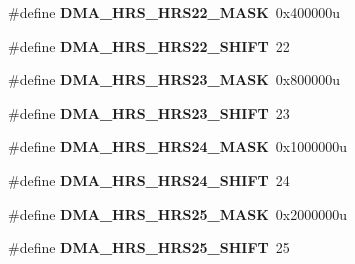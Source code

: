 \begin{DoxyCompactItemize}
\item 
\hypertarget{group___d_m_a___register___masks_ga5c1ab6b8c4a246eced1c289704ed8109}{}\#define {\bfseries D\+M\+A\+\_\+\+H\+R\+S\+\_\+\+H\+R\+S22\+\_\+\+M\+A\+S\+K}~0x400000u\label{group___d_m_a___register___masks_ga5c1ab6b8c4a246eced1c289704ed8109}

\item 
\hypertarget{group___d_m_a___register___masks_ga5133c9a2c93c9f058d928667b477e443}{}\#define {\bfseries D\+M\+A\+\_\+\+H\+R\+S\+\_\+\+H\+R\+S22\+\_\+\+S\+H\+I\+F\+T}~22\label{group___d_m_a___register___masks_ga5133c9a2c93c9f058d928667b477e443}

\item 
\hypertarget{group___d_m_a___register___masks_gaa354a1cc690071c4a04775c601d74a0d}{}\#define {\bfseries D\+M\+A\+\_\+\+H\+R\+S\+\_\+\+H\+R\+S23\+\_\+\+M\+A\+S\+K}~0x800000u\label{group___d_m_a___register___masks_gaa354a1cc690071c4a04775c601d74a0d}

\item 
\hypertarget{group___d_m_a___register___masks_ga572727569bf04812bf880ed05524d9e7}{}\#define {\bfseries D\+M\+A\+\_\+\+H\+R\+S\+\_\+\+H\+R\+S23\+\_\+\+S\+H\+I\+F\+T}~23\label{group___d_m_a___register___masks_ga572727569bf04812bf880ed05524d9e7}

\item 
\hypertarget{group___d_m_a___register___masks_gad1dd0085e9c2aeea50ff63003196af59}{}\#define {\bfseries D\+M\+A\+\_\+\+H\+R\+S\+\_\+\+H\+R\+S24\+\_\+\+M\+A\+S\+K}~0x1000000u\label{group___d_m_a___register___masks_gad1dd0085e9c2aeea50ff63003196af59}

\item 
\hypertarget{group___d_m_a___register___masks_ga681547efd130ba09b33496a5a24772ef}{}\#define {\bfseries D\+M\+A\+\_\+\+H\+R\+S\+\_\+\+H\+R\+S24\+\_\+\+S\+H\+I\+F\+T}~24\label{group___d_m_a___register___masks_ga681547efd130ba09b33496a5a24772ef}

\item 
\hypertarget{group___d_m_a___register___masks_ga26191fdffef2cd12cbe740ddc6b2ef6d}{}\#define {\bfseries D\+M\+A\+\_\+\+H\+R\+S\+\_\+\+H\+R\+S25\+\_\+\+M\+A\+S\+K}~0x2000000u\label{group___d_m_a___register___masks_ga26191fdffef2cd12cbe740ddc6b2ef6d}

\item 
\hypertarget{group___d_m_a___register___masks_gaef1231e8c4f15581fbec6f5fe78f073e}{}\#define {\bfseries D\+M\+A\+\_\+\+H\+R\+S\+\_\+\+H\+R\+S25\+\_\+\+S\+H\+I\+F\+T}~25\label{group___d_m_a___register___masks_gaef1231e8c4f15581fbec6f5fe78f073e}


\end{DoxyCompactItemize}
